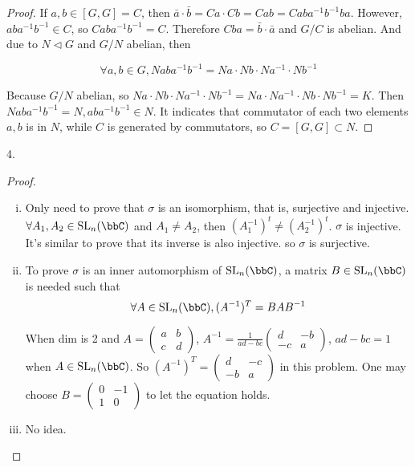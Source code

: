 \begin{proof}
    If $a,b\in [G,G]=C$, then $\bar{a} \cdot \bar{b} = Ca \cdot Cb= Cab=Caba^{-1}b^{-1}ba$. However, $aba^{-1}b^{-1}\in C$, so $Caba^{-1}b^{-1}=C$. Therefore $Cba=\bar{b}\cdot\bar{a}$ and $G/C$ is abelian. And due to $N \triangleleft G$ and $G/N$ abelian, then 
    
    $$\forall a,b\in G, Naba^{-1}b^{-1}=Na\cdot Nb \cdot Na^{-1} \cdot Nb^{-1}$$

    Because $G/N$ abelian, so $Na\cdot Nb \cdot Na^{-1} \cdot Nb^{-1}=Na\cdot Na^{-1} \cdot Nb \cdot Nb^{-1}=K$. Then $Naba^{-1}b^{-1} =N,aba^{-1}b^{-1}\in N$. It indicates that commutator of each two elements $a,b$ is in $N$, while $C$ is generated by commutators, so $C=[G,G]\subset N$.
\end{proof}

\begin{exercise}
    4.
\end{exercise}

\begin{proof}
    \begin{enumerate}[(i)]
        \item Only need to prove that $\sigma$ is an isomorphism, that is, surjective and injective. $\forall A_1, A_2\in \mathrm{SL}_n(\bbC)$ and $A_1\neq A_2$, then $(A_1^{-1})^{t}\neq (A_2^{-1})^{t}$. $\sigma$ is injective. It's similar to prove that its inverse is also injective. so $\sigma$ is surjective.
        \item To prove $\sigma$ is an inner automorphism of $\mathrm{SL}_n (\bbC)$, a matrix $B\in \mathrm{SL}_n (\bbC)$ is needed such that 
        $$\forall A\in \mathrm{SL}_n (\bbC), (A^{-1})^T = BAB^{-1}$$

        When dim is 2 and $A=\begin{pmatrix}
            a & b\\ 
            c & d
            \end{pmatrix}$,  $A^{-1}=\frac{1}{ad-bc}\begin{pmatrix}
                d & -b\\ 
                -c & a
                \end{pmatrix}$, $ad-bc=1$ when $A\in \mathrm{SL}_n (\bbC)$.
                So  $(A^{-1})^T=\begin{pmatrix}
                    d & -c\\ 
                    -b & a
                    \end{pmatrix}$ in this problem. One may choose $B=\begin{pmatrix}
                        0 & -1\\ 
                        1 & 0
                        \end{pmatrix}$ to let the equation holds.
        \item No idea.
    \end{enumerate}
\end{proof}

